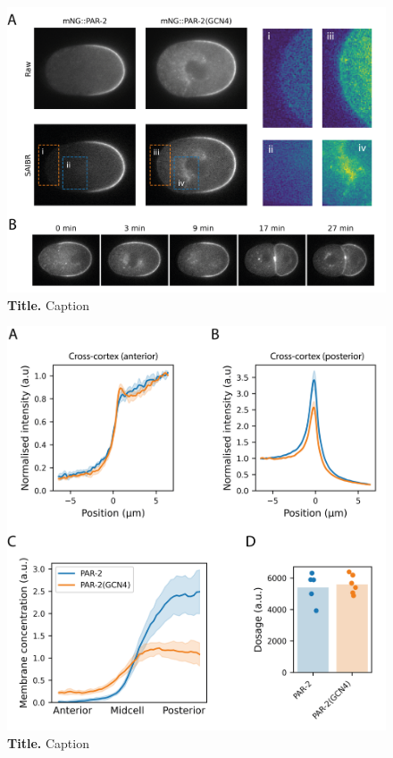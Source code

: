 \documentclass[12pt]{"report"}
\newcommand{\mycaption}[2]{\caption[#1]{\textbf{#1.} #2}}
\begin{document}

\begin{figure}[!h]
\includegraphics[scale=1]{gcn4}
\setlength{\abovecaptionskip}{20pt}
\centering
\mycaption{Title}{Caption}
\label{fig:gcn4}
\end{figure}

\begin{figure}[!h]
\includegraphics[scale=1]{gcn4_quantification}
\setlength{\abovecaptionskip}{20pt}
\centering
\mycaption{Title}{Caption}
\label{fig:gcn4_quantification}
\end{figure}
\end{document}
